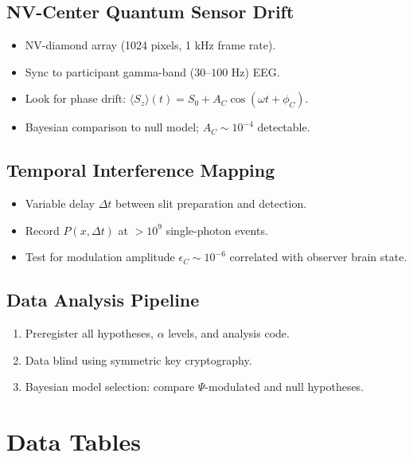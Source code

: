 \documentclass[aps,prx,twocolumn,nofootinbib,superscriptaddress,longbibliography]{revtex4-2}
\begin{document}
\subsection{NV-Center Quantum Sensor Drift}
\begin{itemize}
    \item NV-diamond array (1024 pixels, 1 kHz frame rate).
    \item Sync to participant gamma-band ($30$–$100$ Hz) EEG.
    \item Look for phase drift: $\langle S_z\rangle(t) = S_0 + A_C\cos(\omega t + \phi_C)$.
    \item Bayesian comparison to null model; $A_C \sim 10^{-4}$ detectable.
\end{itemize}

\subsection{Temporal Interference Mapping}
\begin{itemize}
    \item Variable delay $\Delta t$ between slit preparation and detection.
    \item Record $P(x, \Delta t)$ at $>10^9$ single-photon events.
    \item Test for modulation amplitude $\epsilon_C \sim 10^{-6}$ correlated with observer brain state.
\end{itemize}

\subsection{Data Analysis Pipeline}
\begin{enumerate}
    \item Preregister all hypotheses, $\alpha$ levels, and analysis code.
    \item Data blind using symmetric key cryptography.
    \item Bayesian model selection: compare $\Psi$-modulated and null hypotheses.
\end{enumerate}

\section{Data Tables}
\end{document}
